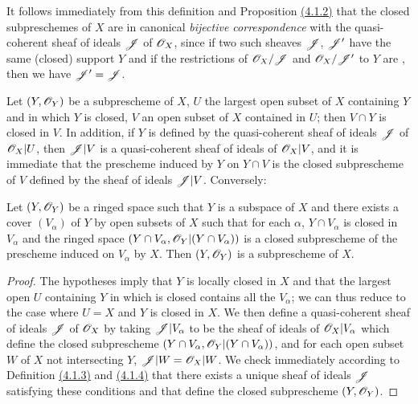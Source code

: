 It follows immediately from this definition and Proposition \hyperref[prop-1.4.1.2]{(4.1.2)}
that the closed subpreschemes of $X$ are in canonical {\it bijective correspondence} with the
quasi-coherent sheaf of ideals $\mathscr{J}$ of $\mathscr{O}_X$, since if two such sheaves
$\mathscr{J}$, $\mathscr{J}'$ have the same (closed) support $Y$ and if the restrictions of
$\mathscr{O}_X/\mathscr{J}$ and $\mathscr{O}_X/\mathscr{J}'$ to $Y$ are , then we have $\mathscr{J}'=\mathscr{J}$.

\begin{env}[4.1.4]
\label{env-1.4.1.4}
Let $(Y,\mathscr{O}_Y)$ be a subprescheme of $X$, $U$ the largest open subset of $X$ containing $Y$
and in which $Y$ is closed, $V$ an open subset of $X$ contained in $U$; then $V\cap Y$ is
closed in $V$. In addition, if $Y$ is defined by the quasi-coherent sheaf of ideals $\mathscr{J}$
of $\mathscr{O}_X|U$, then $\mathscr{J}|V$ is a quasi-coherent sheaf of ideals of $\mathscr{O}_X|V$, and it is
immediate that the prescheme induced by $Y$ on $Y\cap V$ is the closed subprescheme of $V$
defined by the sheaf of ideals $\mathscr{J}|V$. Conversely:
\end{env}

\begin{prop}[4.1.5]
\label{prop-1.4.1.5}
Let $(Y,\mathscr{O}_Y)$ be a ringed space such that $Y$ is a subspace of $X$ and there exists a
cover $(V_\alpha)$ of $Y$ by open subsets of $X$ such that for each $\alpha$,
$Y\cap V_\alpha$ is closed in $V_\alpha$ and the ringed space
$(Y\cap V_\alpha,\mathscr{O}_Y|(Y\cap V_\alpha))$ is a closed subprescheme of the prescheme induced
on $V_\alpha$ by $X$. Then $(Y,\mathscr{O}_Y)$ is a subprescheme of $X$.
\end{prop}

\begin{proof}
\label{proof-prop-1.4.1.5}
The hypotheses imply that $Y$ is locally closed in $X$ and that the largest open $U$
containing $Y$ in which is closed contains all the $V_\alpha$; we can thus reduce to the case
where $U=X$ and $Y$ is closed in $X$. We then define a quasi-coherent sheaf of ideals
$\mathscr{J}$ of $\mathscr{O}_X$ by taking $\mathscr{J}|V_\alpha$ to be the sheaf of ideals of $\mathscr{O}_X|V_\alpha$
which define the closed subprescheme $(Y\cap V_\alpha,\mathscr{O}_Y|(Y\cap V_\alpha))$, and for each
open subset $W$ of $X$ not intersecting $Y$, $\mathscr{J}|W=\mathscr{O}_X|W$. We check immediately
according to Definition \hyperref[defn-1.4.1.3]{(4.1.3)} and \hyperref[env-1.4.1.4]{(4.1.4)}
that there exists a unique sheaf of ideals $\mathscr{J}$ satisfying these conditions and that
define the closed subprescheme $(Y,\mathscr{O}_Y)$.
\end{proof}

